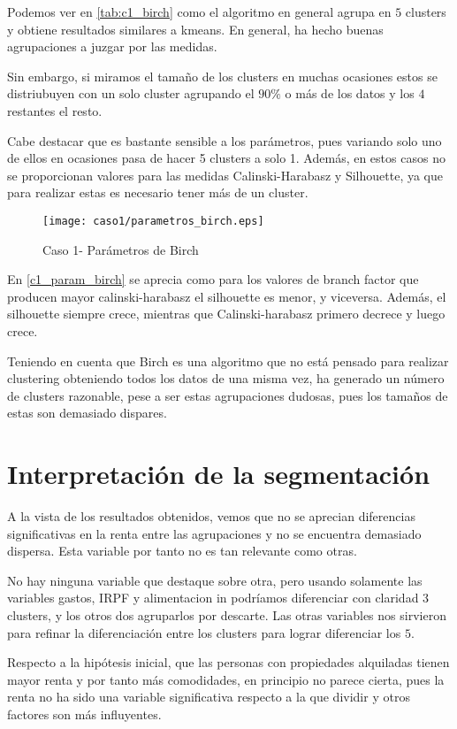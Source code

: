 Podemos ver en \eqref{tab:c1_birch} como el algoritmo en general agrupa en $5$ clusters y obtiene resultados similares a kmeans. En general, ha hecho buenas agrupaciones a juzgar por las medidas.

Sin embargo, si miramos el tamaño de los clusters en muchas ocasiones estos se distriubuyen con un solo cluster agrupando el $90\%$ o más de los datos y los $4$ restantes el resto.

Cabe destacar que es bastante sensible a los parámetros, pues variando solo uno de ellos en ocasiones pasa de hacer 5 clusters a solo 1. Además, en estos casos no se proporcionan valores para las medidas Calinski-Harabasz y Silhouette, ya que para realizar estas es necesario tener más de un cluster.

\begin{figure}[ht]
\caption{Caso 1- Parámetros de Birch}
\label{c1_param_birch}
\texttt{[image: caso1/parametros\_birch.eps]}
\end{figure}

En \eqref{c1_param_birch} se aprecia como para los valores de branch factor que producen mayor calinski-harabasz el silhouette es menor, y viceversa. Además, el silhouette siempre crece, mientras que Calinski-harabasz primero decrece y luego crece.

Teniendo en cuenta que Birch es una algoritmo que no está pensado para realizar clustering obteniendo todos los datos de una misma vez, ha generado un número de clusters razonable, pese a ser estas agrupaciones dudosas, pues los tamaños de estas son demasiado dispares.



\section{Interpretación de la segmentación}

A la vista de los resultados obtenidos, vemos que no se aprecian diferencias significativas en la renta entre las agrupaciones y no se encuentra demasiado dispersa. Esta variable por tanto no es tan relevante como otras.

No hay ninguna variable que destaque sobre otra, pero usando solamente las variables gastos, IRPF y alimentacion in podríamos diferenciar con claridad 3 clusters, y los otros dos agruparlos por descarte. Las otras variables nos sirvieron para refinar la diferenciación entre los clusters para lograr diferenciar los $5$.

Respecto a la hipótesis inicial, que las personas con propiedades alquiladas tienen mayor renta y por tanto más comodidades, en principio no parece cierta, pues la renta no ha sido una variable significativa respecto a la que dividir y otros factores son más influyentes.




